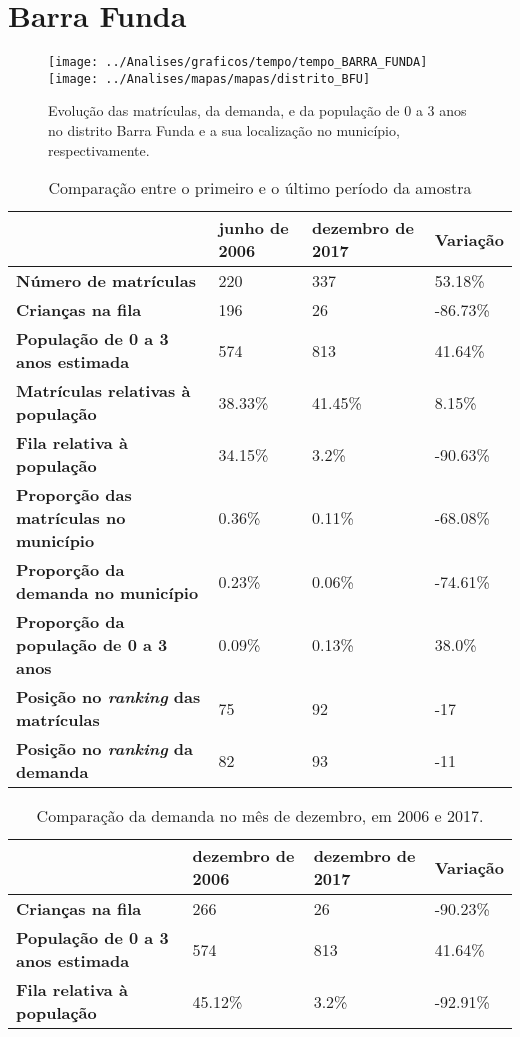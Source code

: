 \section{Barra Funda}
\begin{figure}[H]
\centering
\texttt{[image: ../Analises/graficos/tempo/tempo\_BARRA\_FUNDA]}
\texttt{[image: ../Analises/mapas/mapas/distrito\_BFU]}
\caption{Evolução das matrículas, da demanda, e da população de 0 a 3 anos no distrito Barra Funda e a sua localização no município, respectivamente.}
\end{figure}
\begin{table}[H]
\begin{tabular}{l|l|l|l}
\textbf{}                                      & \textbf{junho de 2006}       & \textbf{dezembro de 2017}    & \textbf{Variação} \\ \hline
\textbf{Número de matrículas}                  & 220 & 337 & 53.18\% \\ \hline
\textbf{Crianças na fila}                      & 196 & 26 & -86.73\% \\ \hline
\textbf{População de 0 a 3 anos estimada}      & 574 & 813 & 41.64\% \\ \hline
\textbf{Matrículas relativas à população}      & 38.33\% & 41.45\% & 8.15\% \\ \hline
\textbf{Fila relativa à população}             & 34.15\% & 3.2\% & -90.63\% \\ \hline
\textbf{Proporção das matrículas no município} & 0.36\% & 0.11\% & -68.08\% \\ \hline
\textbf{Proporção da demanda no município}     & 0.23\% & 0.06\% & -74.61\% \\ \hline
\textbf{Proporção da população de 0 a 3 anos}  & 0.09\% & 0.13\% & 38.0\% \\ \hline
\textbf{Posição no \textit{ranking} das matrículas}     & 75 & 92 & -17 \\ \hline
\textbf{Posição no \textit{ranking} da demanda}         & 82 & 93 & -11 \\ 
\end{tabular}
\caption{Comparação entre o primeiro e o último período da amostra}
\end{table}
\begin{table}[H]
\begin{tabular}{l|l|l|l}
\textbf{}                                 & \textbf{dezembro de 2006} & \textbf{dezembro de 2017} & \textbf{Variação} \\ \hline
\textbf{Crianças na fila}                      & 266 & 26 & -90.23\% \\ \hline
\textbf{População de 0 a 3 anos estimada}      & 574 & 813 & 41.64\% \\ \hline
\textbf{Fila relativa à população}             & 45.12\% & 3.2\% & -92.91\% \\
\end{tabular}
\caption{Comparação da demanda no mês de dezembro, em 2006 e 2017.}
\end{table}
